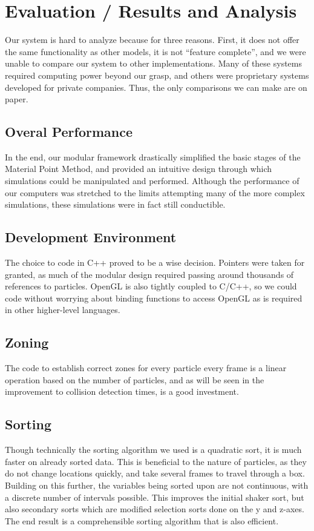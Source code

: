 \documentclass{acm_proc_article-sp}
\begin{document}
\section{Evaluation / Results and Analysis}
Our system is hard to analyze because for three reasons. First, it does not offer the same functionality as other models, it is not “feature complete”, and we were unable to compare our system to other implementations. Many of these systems required computing power beyond our grasp, and others were proprietary systems developed for private companies. Thus, the only comparisons we can make are on paper. 

\subsection{Overal Performance}
In the end, our modular framework drastically simplified the basic stages of the Material Point Method, and provided an intuitive design through which simulations could be manipulated and performed. Although the performance of our computers was stretched to the limits attempting many of the more complex simulations, these simulations were in fact still conductible. 

\subsection{Development Environment}
The choice to code in C++ proved to be a wise decision. Pointers were taken for granted, as much of the modular design required passing around thousands of references to particles. OpenGL is also tightly coupled to C/C++, so we could code without worrying about binding functions to access OpenGL as is required in other higher-level languages.

\subsection{Zoning}
The code to establish correct zones for every particle every frame is a linear operation based on the number of particles, and as will be seen in the improvement to collision detection times, is a good investment.

\subsection{Sorting}
Though technically the sorting algorithm we used is a quadratic sort, it is much faster on already sorted data. This is beneficial to the nature of particles, as they do not change locations quickly, and take several frames to travel through a box. Building on this further, the variables being sorted upon are not continuous, with a discrete number of intervals possible. This improves the initial shaker sort, but also secondary sorts which are modified selection sorts done on the y and z-axes. The end result is a comprehensible sorting algorithm that is also efficient.
\end{document}
